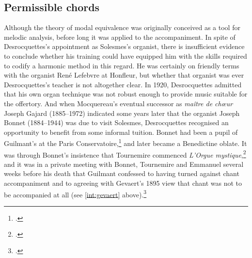 \subsection{Permissible chords}
\label{hl:potiron_methode}%
Although the theory of modal equivalence was originally conceived as a tool for melodic analysis, before long it was applied to the accompaniment.
In spite of Desrocquettes's appointment as Solesmes's organist, there is insufficient evidence to conclude whether his training could have equipped him with the skills required to codify a harmonic method in this regard.
He was certainly on friendly terms with the organist René Lefebvre at Honfleur, but whether that organist was ever Desrocquettes's teacher is not altogether clear.
In 1920, Desrocquettes admitted that his own organ technique was not robust enough to provide music suitable for the offertory.
And when Mocquereau's eventual successor as \emph{maître de chœur} Joseph Gajard (1885--1972) indicated some years later that the organist Joseph Bonnet (1884--1944) was due to visit Solesmes, Desrocquettes recognised an opportunity to benefit from some informal tuition.
Bonnet had been a pupil of Guilmant's at the Paris Conservatoire,\footcite[198]{OchseOrganistsOrganPlaying2000} and later became a Benedictine oblate.
%
It was through Bonnet's insistence that Tournemire commenced \emph{L'Orgue mystique},\footcite[194]{ConnollyInfluencePlainchantFrench2013} and it was in a private meeting with Bonnet, Tournemire and Emmanuel several weeks before his death that Guilmant confessed to having turned against chant accompaniment and to agreeing with Gevaert's 1895 view that chant was not to be accompanied at all (see \cref{int:gevaert} above).\footcite[3]{EmmanuelTraiteaccompagnementmodal1913}

